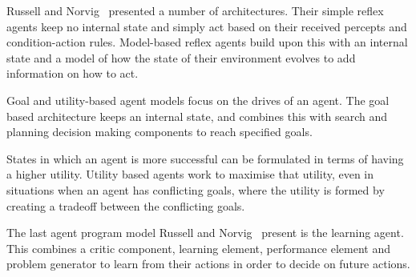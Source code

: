 \documentclass[]{final_report}
\begin{document}
Russell and Norvig~\cite{russell2016artificial} presented a number of architectures. Their simple reflex agents keep no internal state and simply act based on their received percepts and condition-action rules. Model-based reflex agents build upon this with an internal state and a model of how the state of their environment evolves to add information on how to act.\par 
Goal and utility-based agent models focus on the drives of an agent. The goal based architecture keeps an internal state, and combines this with search and planning decision making components to reach specified goals.\par
States in which an agent is more successful can be formulated in terms of having a higher utility. Utility based agents work to maximise that utility, even in situations when an agent has conflicting goals, where the utility is formed by creating a tradeoff between the conflicting goals.\par 
The last agent program model Russell and Norvig~\cite{russell2016artificial} present is the learning agent. This combines a critic component, learning element, performance element and problem generator to learn from their actions in order to decide on future actions.
\end{document}
